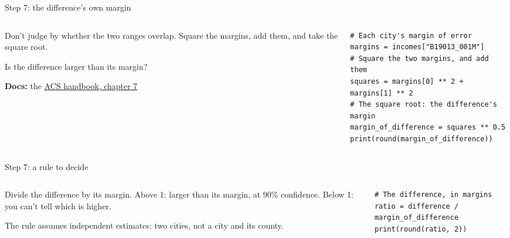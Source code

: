 \documentclass[9pt,aspectratio=169]{beamer}
\begin{document}
\begin{frame}[fragile]{Step 7: the difference's own margin}
    \begin{columns}[T]
        \begin{column}{0.37\textwidth}
            Don't judge by whether the two ranges overlap. Square the margins, add them, and take the square root.

            \medskip
            Is the difference larger than its margin?

            \medskip
            {\scriptsize\textbf{Docs:} the \href{https://www.census.gov/content/dam/Census/library/publications/2020/acs/acs_general_handbook_2020_ch07.pdf}{ACS handbook, chapter 7}\par}
        \end{column}
        \begin{column}{0.6\textwidth}
\begin{lstlisting}
# Each city's margin of error
margins = incomes["B19013_001M"]
# Square the two margins, and add them
squares = margins[0] ** 2 + margins[1] ** 2
# The square root: the difference's margin
margin_of_difference = squares ** 0.5
print(round(margin_of_difference))
\end{lstlisting}
        \end{column}
    \end{columns}
\end{frame}

\begin{frame}[fragile]{Step 7: a rule to decide}
    \begin{columns}[T]
        \begin{column}{0.37\textwidth}
            Divide the difference by its margin. Above 1: larger than its margin, at 90\% confidence. Below 1: you can't tell which is higher.

            \medskip
            The rule assumes independent estimates: two cities, not a city and its county.
        \end{column}
        \begin{column}{0.6\textwidth}
\begin{lstlisting}
# The difference, in margins
ratio = difference / margin_of_difference
print(round(ratio, 2))
\end{lstlisting}
        \end{column}
    \end{columns}
\end{frame}
\end{document}
